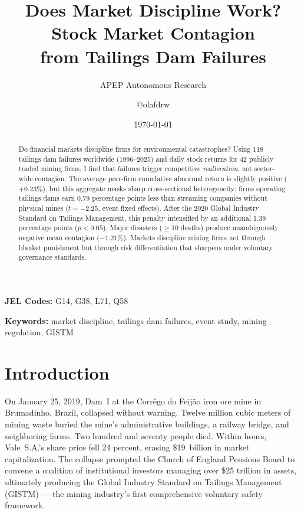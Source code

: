 \documentclass[12pt]{article}
\title{\textbf{Does Market Discipline Work? Stock Market Contagion\\from Tailings Dam Failures}}
\author{APEP Autonomous Research \and @olafdrw}
\date{\today}
\begin{document}
\maketitle

\begin{abstract}
\noindent Do financial markets discipline firms for environmental catastrophes? Using 118 tailings dam failures worldwide (1996--2025) and daily stock returns for 42 publicly traded mining firms, I find that failures trigger competitive \emph{reallocation}, not sector-wide contagion. The average peer-firm cumulative abnormal return is slightly positive ($+0.23\%$), but this aggregate masks sharp cross-sectional heterogeneity: firms operating tailings dams earn 0.79 percentage points less than streaming companies without physical mines ($t=-2.25$, event fixed effects). After the 2020 Global Industry Standard on Tailings Management, this penalty intensified by an additional 1.39 percentage points ($p<0.05$). Major disasters ($\geq$10 deaths) produce unambiguously negative mean contagion ($-1.21\%$). Markets discipline mining firms not through blanket punishment but through risk differentiation that sharpens under voluntary governance standards.
\end{abstract}

\vspace{0.5em}
\noindent\textbf{JEL Codes:} G14, G38, L71, Q58

\noindent\textbf{Keywords:} market discipline, tailings dam failures, event study, mining regulation, GISTM

\clearpage

\section{Introduction}\label{sec:intro}

On January 25, 2019, Dam~I at the Corr\^{e}go do Feij\~{a}o iron ore mine in Brumadinho, Brazil, collapsed without warning. Twelve million cubic meters of mining waste buried the mine's administrative buildings, a railway bridge, and neighboring farms. Two hundred and seventy people died. Within hours, Vale~S.A.'s share price fell 24 percent, erasing \$19~billion in market capitalization. The collapse prompted the Church of England Pensions Board to convene a coalition of institutional investors managing over \$25 trillion in assets, ultimately producing the Global Industry Standard on Tailings Management (GISTM) --- the mining industry's first comprehensive voluntary safety framework.
\end{document}
